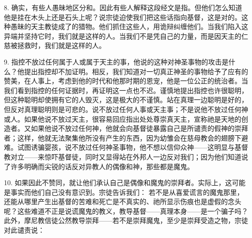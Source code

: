 8. 确实，有些人愚昧地区分和。因此有些人解释这段经文是指。但他们怎么知道他是挂在木头上还是石头上呢？说宗徒迫使我们把这些话指向基督，这是对的。这种愚昧的天主教徒成了的猎物。他们抓住这些人，用诡辩纠缠他们。当我们陷入这异端并坚持它时，我们就是这样的人。当我们不是凭自己的力量，而是因天主的仁慈被拯救时，我们就是这样的人。\par

9. 指控不放过任何属于人或属于天主的事，他说的这种对神圣事物的攻击是什么？他提出指控却不加证明。相反，我们知道对一切真正神圣的事物给予了应有的赞美，在人事上，考虑到他的时代和他那时期的恩宠，他是一位公正的统治者。当我们看到指控的任何证据时，再证明这一点也不迟。谨慎地提出指控也许很聪明，但这种聪明却使拥有它的人毁灭，这是极大的不谨慎。站在真理一边聪明是好的，但反对真理聪明则是可悲的。说不放过任何人事或天主事；不是说他不放过任何神或人。如果他说不放过天主，很容易回应指出处处尊崇真天主，宣称祂是天地的创造者。又如果他说不放过任何神，他就会向基督徒暴露自己是所谴责的假神的崇拜者；这样，他就无法聚集他所没有产生的东西，因为幼雏会在慈母教会的翅膀下避难。试图诱骗婴孩，说不放过任何神圣事物，他不想以信仰众神——这明显与基督教对立——来惊吓基督徒，同时又显得站在外邦人一边反对我们；因为他们知道说了许多明确而尖锐的话反对异教人的偶像和神，那些都是魔鬼。\par

10. 如果因此不赞同，就让他们承认自己是偶像和魔鬼的崇拜者。实际上，这可能是事实而他们自己没有意识到。宗徒告诉我们： 若不是从喜爱谎言的魔鬼那里，还能从哪里产生出基督的苦难和死亡是不真实的、祂所显示伤痕也是虚假的念头呢？这些难道不正是说谎魔鬼的教义，教导基督——真理本身——是一个骗子吗？此外，摩尼教信徒公然教导崇拜——若不是崇拜魔鬼，至少是崇拜受造之物，宗徒对此谴责说：\par

